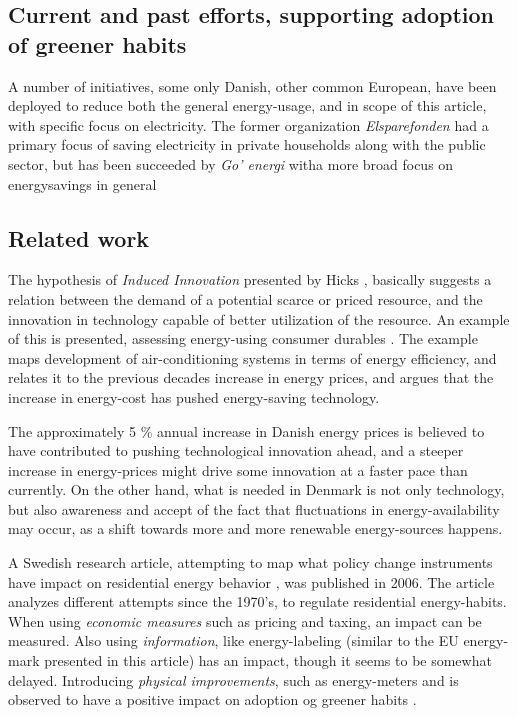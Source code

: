 \documentclass[journal]{IEEEtran}
\begin{document}
\subsection{Current and past efforts, supporting adoption of greener habits}
A number of initiatives, some only Danish, other common European, have been deployed to reduce both the general energy-usage, and in scope of this article, with specific focus on electricity. The former organization \textit{Elsparefonden} had a primary focus of saving electricity in private households along with the public sector, but has been succeeded by \textit{Go' energi} witha more broad focus on energysavings in general \cite{ing_elspar} 

\subsection{Related work}
The hypothesis of \textit{Induced Innovation} presented by Hicks \cite{hicks}, basically suggests a relation between the demand of a potential scarce or priced resource, and the innovation in technology capable of better utilization of the resource. 
An example of this is presented, assessing energy-using consumer durables \cite{newell}. The example maps development of air-conditioning systems in terms of energy efficiency, and relates it to the previous decades increase in energy prices, and argues that the increase in energy-cost has pushed energy-saving technology.\newline

The approximately 5 \% annual increase in Danish energy prices is believed to have contributed to pushing technological innovation ahead, and a steeper increase in energy-prices might drive some innovation at a faster pace than currently.
On the other hand, what is needed in Denmark is not only technology, but also awareness and accept of the fact that fluctuations in energy-availability may occur, as a shift towards more and more renewable energy-sources happens.\newline

A Swedish research article, attempting to map what policy change instruments have impact on residential energy behavior \cite{swedish}, was published in 2006. The article analyzes different attempts since the 1970's, to regulate residential energy-habits. 
When using \textit{economic measures} such as pricing and taxing, an impact can be measured. Also using \textit{information}, like energy-labeling (similar to the EU energy-mark presented in this article) has an impact, though it seems to be somewhat delayed. Introducing \textit{physical improvements}, such as energy-meters and is observed to have a positive impact on adoption og greener habits \cite{swedish}.\newline
\end{document}
